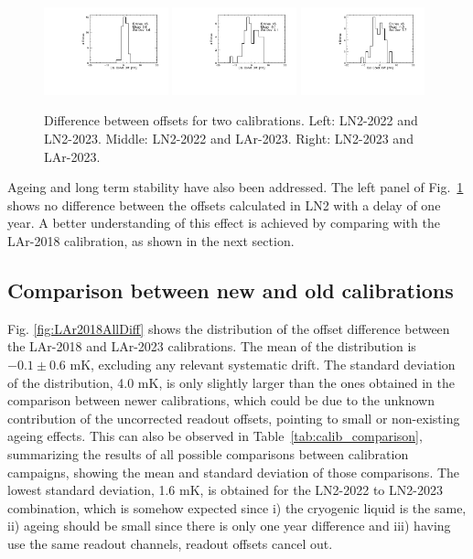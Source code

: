 \begin{figure}[htbp]
\centering
{\includegraphics[width=0.32\textwidth]{images/figure_21_a.pdf}}
{\includegraphics[width=0.32\textwidth]{images/figure_21_b.pdf}}
{\includegraphics[width=0.32\textwidth]{images/figure_21_c.pdf}}
\caption{Difference between offsets for two calibrations. Left: LN2-2022 and LN2-2023. Middle: LN2-2022 and LAr-2023. Right:  LN2-2023 and LAr-2023.}
\label{fig:comp_newCalib}
\end{figure}

Ageing and long term stability have also been addressed. The left panel of Fig.~\ref{fig:comp_newCalib} shows no difference between the offsets calculated in LN2 with a delay of one year. A better understanding of this effect is achieved by comparing with the LAr-2018 calibration, as shown in the next section.

\subsection{Comparison between new and old calibrations}
\label{sec:compNewOld}

\noindent Fig. \ref{fig:LAr2018AllDiff} shows the distribution of the offset difference between the LAr-2018 and LAr-2023 calibrations. The mean of the distribution is $-0.1\pm0.6$ mK, excluding any relevant systematic drift. The standard deviation of the distribution, 4.0 mK, is only slightly larger than the ones obtained in the comparison between newer calibrations, which could be due to the unknown contribution of the uncorrected readout offsets, pointing to small or non-existing ageing effects. This can also be observed in Table~\ref{tab:calib_comparison}, summarizing the results of all possible comparisons between calibration campaigns, showing the mean and standard deviation of those comparisons. The lowest standard deviation, 1.6 mK, is obtained for the LN2-2022 to LN2-2023 combination, which is somehow expected since i) the cryogenic liquid is the same, ii) ageing should be small since there is only one year difference and iii) having use the same readout channels, readout offsets cancel out.

